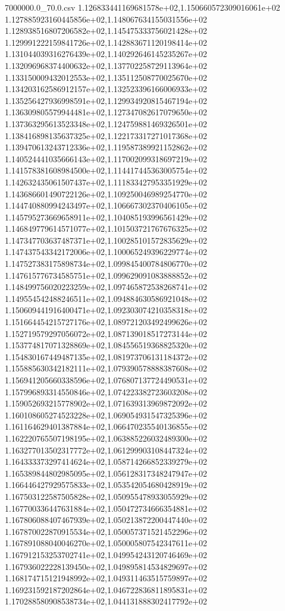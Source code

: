 \begin{filecontents*}{7000000.0_70.0.csv}
1.126833441169681578e+02,1.150660572309016061e+02
1.127885923160445856e+02,1.148067634155031556e+02
1.128938516807206582e+02,1.145475333756021428e+02
1.129991222159841726e+02,1.142883671120198414e+02
1.131044039316276439e+02,1.140292646145235267e+02
1.132096968374400632e+02,1.137702258729113964e+02
1.133150009432012553e+02,1.135112508770025670e+02
1.134203162586912157e+02,1.132523396166006933e+02
1.135256427936998591e+02,1.129934920815467194e+02
1.136309805579944481e+02,1.127347082617079650e+02
1.137363295613523348e+02,1.124759881469326501e+02
1.138416898135637325e+02,1.122173317271017368e+02
1.139470613243712336e+02,1.119587389921152862e+02
1.140524441035666143e+02,1.117002099318697219e+02
1.141578381608984500e+02,1.114417445363005754e+02
1.142632435061507437e+02,1.111833427953351929e+02
1.143686601490722126e+02,1.109250046989254770e+02
1.144740880994243497e+02,1.106667302370406105e+02
1.145795273669658911e+02,1.104085193996561429e+02
1.146849779614571077e+02,1.101503721767676325e+02
1.147347703637487371e+02,1.100285101572835629e+02
1.147437543342172006e+02,1.100065249396229774e+02
1.147527383175898734e+02,1.099845400784806770e+02
1.147615776734585751e+02,1.099629091083888852e+02
1.148499756020223259e+02,1.097465872538268741e+02
1.149554542488246511e+02,1.094884630586921048e+02
1.150609441916400471e+02,1.092303074210358318e+02
1.151664454215727176e+02,1.089721203492499626e+02
1.152719579297056072e+02,1.087139018517273144e+02
1.153774817071328869e+02,1.084556519368825320e+02
1.154830167449487135e+02,1.081973706131184372e+02
1.155885630342182111e+02,1.079390578888387608e+02
1.156941205660338596e+02,1.076807137724490531e+02
1.157996893314550846e+02,1.074223382723603208e+02
1.159052693215778902e+02,1.071639313969872092e+02
1.160108605274523228e+02,1.069054931547325396e+02
1.161164629401387884e+02,1.066470235540136855e+02
1.162220765507198195e+02,1.063885226032489300e+02
1.163277013502317772e+02,1.061299903108447324e+02
1.164333373297414624e+02,1.058714266852339279e+02
1.165389844802985095e+02,1.056128317348247947e+02
1.166446427929575833e+02,1.053542054680428919e+02
1.167503122587505828e+02,1.050955478933055929e+02
1.167700336447631884e+02,1.050472734666354881e+02
1.167806088407467939e+02,1.050213872200447440e+02
1.167870022870915534e+02,1.050057371521452296e+02
1.167891088040046270e+02,1.050005807542347611e+02
1.167912153253702741e+02,1.049954243120746469e+02
1.167936022228139450e+02,1.049895814534829697e+02
1.168174715121948992e+02,1.049311463515759897e+02
1.169231592187202864e+02,1.046722836811895831e+02
1.170288580908538734e+02,1.044131888302417792e+02

\end{filecontents*}
